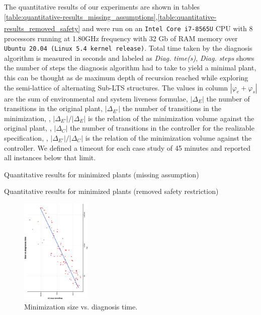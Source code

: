 The quantitative results of our experiments are shown in tables 
\ref{table:quantitative-results_missing_assumptions},\ref{table:quantitative-results_removed_safety}  and were run on an 
\texttt{Intel\textsuperscript{\textregistered} Core\textsuperscript{\texttrademark}
 i7-8565U} CPU with 8 processors running at 1.80GHz frequency
with 32 Gb of RAM memory over \texttt{Ubuntu 20.04 (Linux 5.4 kernel release)}.
Total time taken by the diagnosis algorithm is measured in seconds and
labeled as \emph{Diag. time(s)}, \emph{Diag. steps} shows the number of steps the diagnosis algorithm had to take to yield a minimal plant, this can be thought as de maximum depth of recursion reached while exploring the semi-lattice of alternating Sub-LTS structures.  The values in column $|\varphi_e + \varphi_s|$ are the sum of environmental and system liveness formulae, $|\Delta_{E}|$ the number of transitions in the original plant, $|\Delta_{E'}|$ the number of transitions in the minimization,
, $|\Delta_{E'}|/|\Delta_{E}|$ is the relation of the minimization volume against the original plant, , $|\Delta_{C}|$ the number of transitions in the controller for the realizable specification,
, $|\Delta_{E'}|/|\Delta_{C}|$ is the relation of the minimization volume against the controller.
We defined a timeout for each case study of 45 minutes and reported all instances below that limit.
\begin{table}
	\resizebox{\textwidth}{!} {

}
  \caption{Quantitative results for minimized plants (missing assumption)}
  \label{table:quantitative-results_missing_assumptions}
 \end{table}
\begin{table}
	\resizebox{\textwidth}{!} {
		
	}
	\caption{Quantitative results for minimized plants (removed safety restriction)}
	\label{table:quantitative-results_removed_safety}
\end{table}
\begin{figure}[bt]
	\centering
	\SmallPicture
	\includegraphics[width=0.3\textwidth, angle=-90]{../experimental_setting/tmp_results/size_vs_diag_time.ps}
	\vspace*{-2mm}
	\caption{Minimization size vs. diagnosis time.}
	\label{fig:size_vs_diag_time}
	\vspace*{-4mm}
	\MediumPicture
\end{figure}
